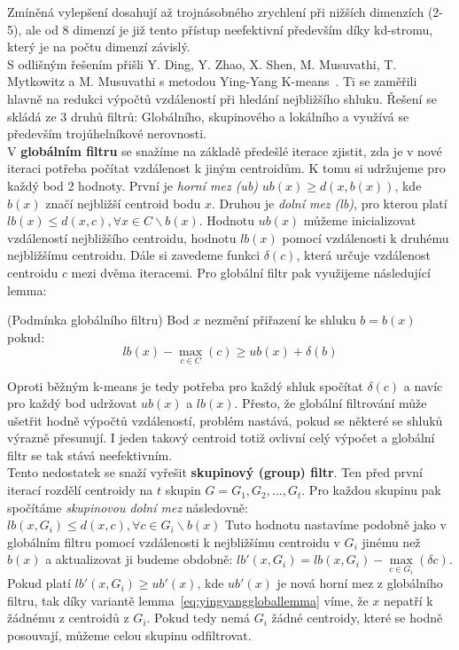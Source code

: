 Zmíněná vylepšení dosahují až trojnásobného zrychlení při nižších dimenzích (2-5), ale od 8 dimenzí je již tento přístup neefektivní především díky kd-stromu, který je na počtu dimenzí závislý.\\

S odlišným řešením přišli Y. Ding, Y. Zhao,  X. Shen, M. Musuvathi, T. Mytkowitz a M. Musuvathi s metodou Ying-Yang K-means~\cite{ding15}. Ti se zaměřili hlavně na redukci výpočtů vzdáleností při hledání nejbližšího shluku. Řešení se skládá ze 3 druhů filtrů: Globálního, skupinového a lokálního a využívá se především trojúhelníkové nerovnosti.\\

V \textbf{globálním filtru} se snažíme na základě předešlé iterace zjistit, zda je v nové iteraci potřeba počítat vzdálenost k jiným centroidům. K tomu si udržujeme pro každý bod 2 hodnoty. První je \textit{horní mez (ub)} $ub(x) \ge d(x,b(x))$, kde $b(x)$ značí nejbližší centroid bodu $x$. Druhou je \textit{dolní mez (lb)}, pro kterou platí $lb(x) \le d(x,c), \forall x \in C\backslash b(x)$. Hodnotu $ub(x)$ můžeme inicializovat vzdáleností nejbližšího centroidu, hodnotu $lb(x)$ pomocí vzdálenosti k druhému nejbližšímu centroidu. Dále si zavedeme funkci $\delta(c)$, která určuje vzdálenost centroidu $c$ mezi dvěma iteracemi. Pro globální filtr pak využijeme následující lemma:
\begin{lemma}\label{eq:yingyanggloballemma}
(Podmínka globálního filtru) Bod $x$ nezmění přiřazení ke shluku $b = b(x)$ pokud:
$$lb(x) - \max\limits_{c\in C}(c) \ge ub(x) + \delta(b)$$
\end{lemma}
Oproti běžným k-means je tedy potřeba pro každý shluk spočítat $\delta(c)$ a navíc pro každý bod udržovat $ub(x)$ a $lb(x)$. Přesto, že globální filtrování může ušetřit hodně výpočtů vzdáleností, problém nastává, pokud se některé se shluků výrazně přesunují. I jeden takový centroid totiž ovlivní celý výpočet a globální filtr se tak stává neefektivním.\\

Tento nedostatek se snaží vyřešit \textbf{skupinový (group) filtr}. Ten před první iterací rozdělí centroidy na $t$ skupin $G={G_1,G_2,...,G_t}$. Pro každou skupinu pak spočítáme \textit{skupinovou dolní mez} následovně: $lb(x,G_i) \le d(x,c), \forall c \in G_i \backslash b(x)$ Tuto hodnotu nastavíme podobně jako v globálním filtru pomocí vzdálenosti k nejbližšímu centroidu v $G_i$ jinému než $b(x)$ a aktualizovat ji budeme obdobně: $lb'(x,G_i)=lb(x,G_i)-\max\limits_{c \in G_i}(\delta c)$. Pokud platí $lb'(x,G_i)\ge ub'(x)$, kde $ub'(x)$ je nová horní mez z globálního filtru, tak díky variantě lemma~\ref{eq:yingyanggloballemma} víme, že $x$ nepatří k žádnému z centroidů z $G_i$. Pokud tedy nemá $G_i$ žádné centroidy, které se hodně posouvají, můžeme celou skupinu odfiltrovat.\\

